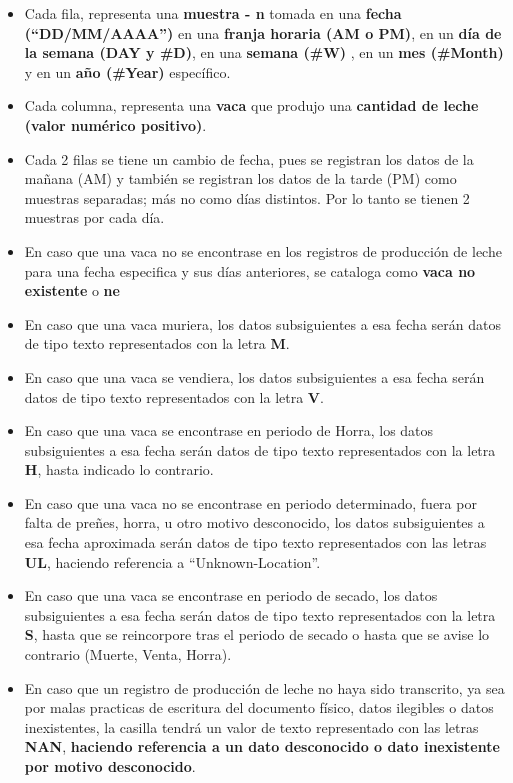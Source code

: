 \begin{itemize}
    \item Cada fila, representa una \textbf{muestra - n} tomada en una \textbf{fecha (``DD/MM/AAAA'')} en una \textbf{franja horaria (AM o PM)}, en un \textbf{día de la semana (DAY y \#D)}, en una \textbf{semana (\#W)} , en un \textbf{mes (\#Month)} y en un \textbf{año (\#Year)} específico.
    \item Cada columna, representa una \textbf{vaca} que produjo una \textbf{cantidad de leche (valor numérico positivo)}.
    \item Cada 2 filas se tiene un cambio de fecha, pues se registran los datos de la mañana (AM) y también se registran los datos de la tarde (PM) como muestras separadas; más no como días distintos. Por lo tanto se tienen 2 muestras por cada día.
    \item En caso que una vaca no se encontrase en los registros de producción de leche para una fecha especifica y sus días anteriores, se cataloga como \textbf{vaca no existente} o \textbf{ne}
    \item En caso que una vaca muriera, los datos subsiguientes a esa fecha serán datos de tipo texto representados con la letra \textbf{M}.
    \item En caso que una vaca se vendiera,  los datos subsiguientes a esa fecha serán datos de tipo texto representados con la letra \textbf{V}.
    \item En caso que una vaca se encontrase en periodo de Horra,  los datos subsiguientes a esa fecha serán datos de tipo texto representados con la letra \textbf{H}, hasta indicado lo contrario.
    \item En caso que una vaca no se encontrase en periodo determinado, fuera por falta de preñes, horra, u otro motivo desconocido,  los datos subsiguientes a esa fecha aproximada serán datos de tipo texto representados con las letras \textbf{UL}, haciendo referencia a ``Unknown-Location''.
    \item En caso que una vaca se encontrase en periodo de secado, los datos subsiguientes a esa fecha serán datos de tipo texto representados con la letra \textbf{S}, hasta que se reincorpore tras el periodo de secado o hasta que se avise lo contrario (Muerte, Venta, Horra).
    \item En caso que un registro de producción de leche no haya sido transcrito, ya sea por malas practicas de escritura del documento físico, datos ilegibles o datos inexistentes, la casilla tendrá un valor de texto representado con las letras \textbf{NAN}, \textbf{haciendo referencia a un dato desconocido o dato inexistente por motivo desconocido}.

\end{itemize}
